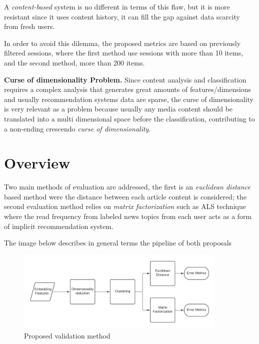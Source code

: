 \documentclass[ecp,tc,english]{iiufrgs}
\begin{document}
        A \textit{content-based} system is no different in terms of this flaw, but it is more resistant since it uses content history, it can fill the gap against data scarcity from fresh users.
        
        In order to avoid this dilemma, the proposed metrics are based on previously filtered sessions, where the first method use sessions with more than 10 items, and the second method, more than 200 items.
    
        \textbf{Curse of dimensionality Problem.} Since content analysis and classification requires a complex analysis that generates great amounts of features/dimensions and usually recommendation systems data are sparse, the curse of dimensionality \cite{marimont1979} is very relevant as a problem because usually any media content should be translated into a multi dimensional space before the classification, contributing to a non-ending crescendo \textit{curse of dimensionality}.
    
    \newpage
    \section{Overview}
        Two main methods of evaluation are addressed, the first is an \textit{euclidean distance} based method were the distance between each article content is considered; the second evaluation method relies on \textit{matrix factorization} such as ALS technique \cite{takane1977} where the read frequency from labeled news topics from each user acts as a form of implicit recommendation system.
        
        The image below describes in general terms the pipeline of both proposals
        
        \begin{figure}[H]
            \centering
            \includegraphics[width=0.9\textwidth]{images/experiment.png}
            \caption{Proposed validation method}
            \label{fig:method_architecture}
        \end{figure}
    
\end{document}

